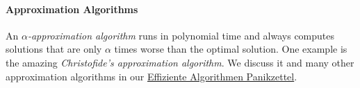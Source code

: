 \documentclass[english]{panikzettel}
\begin{document}
\paragraph{Approximation Algorithms}
An \emph{$\alpha$-approximation algorithm} runs in polynomial time and always computes solutions that are only $\alpha$ times worse than the optimal solution.
One example is the amazing \emph{Christofide's approximation algorithm}.
We discuss it and many other approximation algorithms in our \href{https://panikzettel.philworld.de/effi.pdf}{Effiziente Algorithmen Panikzettel}.
\end{document}

